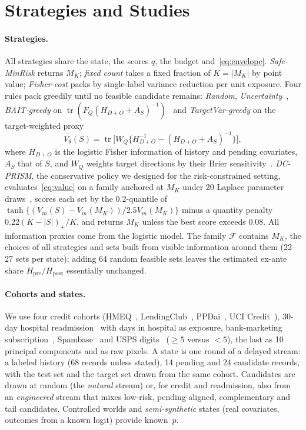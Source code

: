 \documentclass[runningheads]{llncs}
\newcommand{\Hpost}{H_{\mathrm{post}}}
\newcommand{\Hpre}{H_{\mathrm{pre}}}
\begin{document}
\section{Strategies and Studies}
\label{sec:policy}
\paragraph{Strategies.} All strategies share the state, the scores $q$, the budget and~\eqref{eq:envelope}. \emph{Safe-MinRisk} returns $M_K$; \emph{fixed count} takes a fixed fraction of $K=|M_K|$ by point value; \emph{Fisher-cost} packs by single-label variance reduction per unit exposure. Four rules pack greedily until no feasible candidate remains: \emph{Random}, \emph{Uncertainty}~\cite{lewis1994sequential}, \emph{BAIT-greedy} on $\operatorname{tr}(F_Q(H_{D+O}+A_S)^{-1})$~\cite{ash2021fishing} and \emph{TargetVar-greedy} on the target-weighted proxy
\begin{equation}
 V_\theta(S)=\operatorname{tr}\big[W_Q\{H_{D+O}^{-1}-(H_{D+O}+A_S)^{-1}\}\big],\label{eq:value}
\end{equation}
where $H_{D+O}$ is the logistic Fisher information of history and pending covariates, $A_S$ that of $S$, and $W_Q$ weights target directions by their Brier sensitivity~\cite{yu2006transductive,bickfordsmith2023prediction}. \emph{DC-PRISM}, the conservative policy we designed for the risk-constrained setting, evaluates~\eqref{eq:value} on a family anchored at $M_K$ under 20 Laplace parameter draws~\cite{mackay1992practical}, scores each set by the 0.2-quantile of $\tanh\{(V_m(S)-V_m(M_K))/2.5V_m(M_K)\}$ minus a quantity penalty $0.22(K-|S|)_+/K$, and returns $M_K$ unless the best score exceeds $0.08$. All information proxies come from the logistic model. The family $\mathcal F$ contains $M_K$, the choices of all strategies and sets built from visible information around them (22--27 sets per state); adding 64 random feasible sets leaves the estimated ex-ante share $\Hpre/\Hpost$ essentially unchanged.

\paragraph{Cohorts and states.} We use four credit cohorts (HMEQ~\cite{sasHMEQ}, LendingClub~\cite{lendingclubSource}, PPDai~\cite{ppdaiSource,he2018ensemble}, UCI Credit~\cite{yeh2009comparison}), 30-day hospital readmission~\cite{strack2014impact} with days in hospital as exposure, bank-marketing subscription~\cite{moro2014bank}, Spambase~\cite{hopkins1999spambase} and USPS digits~\cite{hull1994usps} ($\ge5$ versus $<5$), the last as 10 principal components and as raw pixels. A state is one round of a delayed stream: a labeled history (68 records unless stated), 14 pending and 24 candidate records, with the test set and the target set drawn from the same cohort. Candidates are drawn at random (the \emph{natural} stream) or, for credit and readmission, also from an \emph{engineered} stream that mixes low-risk, pending-aligned, complementary and tail candidates. Controlled worlds and \emph{semi-synthetic} states (real covariates, outcomes from a known logit) provide known~$p$.
\end{document}
